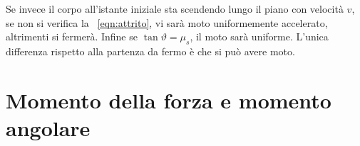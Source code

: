 \documentclass[10pt,a4paper]{book}
\begin{document}
Se invece il corpo all'istante iniziale sta scendendo lungo il piano con velocità $v$, se non si verifica la ~\eqref{eqn:attrito}, vi sarà moto uniformemente accelerato, altrimenti si fermerà. Infine se $\tan\vartheta=\mu_s$, il moto sarà uniforme. L'unica differenza rispetto alla partenza da fermo è che si può avere moto.







































\section{Momento della forza e momento angolare}
\end{document}

